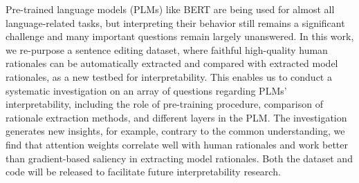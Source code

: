 Pre-trained language models (PLMs) like BERT are being used for almost all language-related tasks, but interpreting their behavior still remains a significant challenge and many important questions remain largely unanswered. In this work, we re-purpose a sentence editing dataset, where faithful high-quality human rationales can be automatically extracted and compared with extracted model rationales, as a new testbed for interpretability. This enables us to conduct a systematic investigation on an array of questions regarding PLMs' interpretability, including the role of pre-training procedure, comparison of rationale extraction methods, and different layers in the PLM. The investigation generates new insights, for example, contrary to the common understanding, we find that attention weights correlate well with human rationales and work better than gradient-based saliency in extracting model rationales. Both the dataset and code will be released to facilitate future interpretability research.
